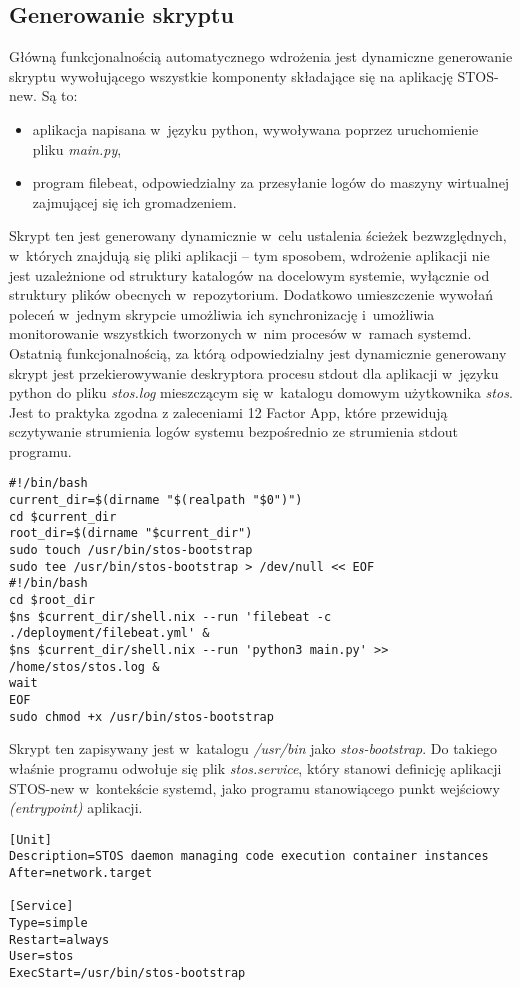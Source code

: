 \subsection{Generowanie skryptu}
Główną funkcjonalnością automatycznego wdrożenia jest dynamiczne generowanie skryptu wywołującego wszystkie komponenty składające się na aplikację STOS-new. Są to:
\begin{itemize}
	\item aplikacja napisana w~języku python, wywoływana poprzez uruchomienie pliku \textit{main.py},
	\item program filebeat, odpowiedzialny za przesyłanie logów do maszyny wirtualnej zajmującej się ich gromadzeniem.
\end{itemize}
Skrypt ten jest generowany dynamicznie w~celu ustalenia ścieżek bezwzględnych, w~których znajdują się pliki aplikacji -- tym sposobem, wdrożenie aplikacji nie jest uzależnione od struktury katalogów na docelowym systemie, wyłącznie od struktury plików obecnych w~repozytorium. Dodatkowo umieszczenie wywołań poleceń w~jednym skrypcie umożliwia ich synchronizację i~umożliwia monitorowanie wszystkich tworzonych w~nim procesów w~ramach systemd. Ostatnią funkcjonalnością, za którą odpowiedzialny jest dynamicznie generowany skrypt jest przekierowywanie deskryptora procesu stdout dla aplikacji w~języku python do pliku \textit{stos.log} mieszczącym się w~katalogu domowym użytkownika \textit{stos}. Jest to praktyka zgodna z zaleceniami 12 Factor App, które przewidują sczytywanie strumienia logów systemu bezpośrednio ze strumienia stdout programu\cite{12fa}.
\lstset{style=shell}
\begin{lstlisting}[caption = {Dynamiczne generowanie skryptu uruchamiającego aplikację STOS, uwzględniającego ścieżki bezwzlędne, w~których znajdują się pliki źródłowe aplikacji}]
#!/bin/bash
current_dir=$(dirname "$(realpath "$0")")
cd $current_dir
root_dir=$(dirname "$current_dir")
sudo touch /usr/bin/stos-bootstrap
sudo tee /usr/bin/stos-bootstrap > /dev/null << EOF
#!/bin/bash
cd $root_dir
$ns $current_dir/shell.nix --run 'filebeat -c ./deployment/filebeat.yml' &
$ns $current_dir/shell.nix --run 'python3 main.py' >> /home/stos/stos.log &
wait
EOF
sudo chmod +x /usr/bin/stos-bootstrap
\end{lstlisting}
Skrypt ten zapisywany jest w~katalogu \textit{/usr/bin} jako \textit{stos-bootstrap}. Do takiego właśnie programu odwołuje się plik \textit{stos.service}, który stanowi definicję aplikacji STOS-new w~kontekście systemd, jako programu stanowiącego punkt wejściowy \textit{(entrypoint)} aplikacji.
\begin{lstlisting}[caption = {Definicja aplikacji STOS-new jako serwisu w~kontekście systemd}]
[Unit]
Description=STOS daemon managing code execution container instances
After=network.target

[Service]
Type=simple
Restart=always
User=stos
ExecStart=/usr/bin/stos-bootstrap
\end{lstlisting}
